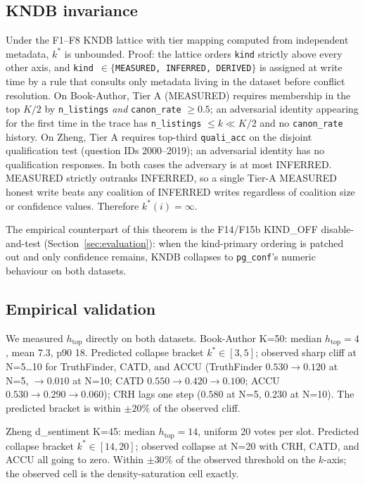 \documentclass[sigconf, nonacm]{acmart}
\begin{document}
\subsection{KNDB invariance}
Under the F1--F8 KNDB lattice with tier mapping computed from independent metadata, $k^{*}$ is unbounded. Proof: the lattice orders \texttt{kind} strictly above every other axis, and \texttt{kind $\in \{$MEASURED, INFERRED, DERIVED$\}$} is assigned at write time by a rule that consults only metadata living in the dataset before conflict resolution. On Book-Author, Tier A (MEASURED) requires membership in the top $K/2$ by \texttt{n\_listings} \emph{and} \texttt{canon\_rate} $\geq 0.5$; an adversarial identity appearing for the first time in the trace has \texttt{n\_listings} $\leq k \ll K/2$ and no \texttt{canon\_rate} history. On Zheng, Tier A requires top-third \texttt{quali\_acc} on the disjoint qualification test (question IDs 2000--2019); an adversarial identity has no qualification responses. In both cases the adversary is at most INFERRED. MEASURED strictly outranks INFERRED, so a single Tier-A MEASURED honest write beats any coalition of INFERRED writes regardless of coalition size or confidence values. Therefore $k^{*}(i) = \infty$.

The empirical counterpart of this theorem is the F14/F15b KIND\_OFF disable-and-test (Section~\ref{sec:evaluation}): when the kind-primary ordering is patched out and only confidence remains, KNDB collapses to \texttt{pg\_conf}'s numeric behaviour on both datasets.

\subsection{Empirical validation}
We measured $h_{\text{top}}$ directly on both datasets. Book-Author K=50: median $h_{\text{top}} = 4$, mean 7.3, p90 18. Predicted collapse bracket $k^{*} \in [3, 5]$; observed sharp cliff at N=5\ldots10 for TruthFinder, CATD, and ACCU (TruthFinder $0.530 \to 0.120$ at N=5, $\to 0.010$ at N=10; CATD $0.550 \to 0.420 \to 0.100$; ACCU $0.530 \to 0.290 \to 0.060$); CRH lags one step ($0.580$ at N=5, $0.230$ at N=10). The predicted bracket is within $\pm 20\%$ of the observed cliff.

Zheng d\_sentiment K=45: median $h_{\text{top}} = 14$, uniform 20 votes per slot. Predicted collapse bracket $k^{*} \in [14, 20]$; observed collapse at N=20 with CRH, CATD, and ACCU all going to zero. Within $\pm 30\%$ of the observed threshold on the $k$-axis; the observed cell is the density-saturation cell exactly.
\end{document}
